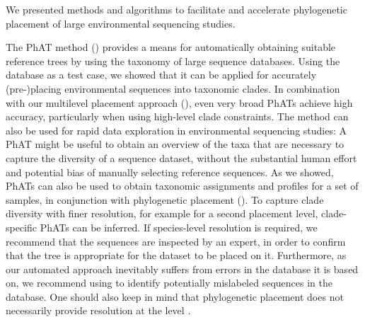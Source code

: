 We presented methods and algorithms to facilitate and accelerate
phylogenetic placement of large environmental sequencing studies. %

The \acf{PhAT} method () provides a means
for automatically obtaining suitable reference trees by using the taxonomy of large sequence databases.
Using the  database as a test case,
we showed that it can be applied for accurately (pre-)placing environmental sequences into taxonomic clades.
In combination with our multilevel placement approach (),
even very broad \acp{PhAT} achieve high accuracy, particularly when using high-level clade constraints.
The method can also be used for rapid data exploration in environmental sequencing studies:
A \ac{PhAT} might be useful to obtain an overview of the taxa that are necessary to capture the diversity of a sequence dataset,
without the substantial human effort and potential bias of manually selecting reference sequences.
As we showed, \acp{PhAT} can also be used to obtain taxonomic assignments and profiles for a set of samples,
in conjunction with phylogenetic placement ().
To capture clade diversity with finer resolution, for example for a second placement level,
clade-specific \acp{PhAT} can be inferred.
If species-level resolution is required, we recommend that the sequences are inspected by an expert,
in order to confirm that the tree is appropriate for the dataset to be placed on it.
Furthermore, as our automated approach inevitably suffers from errors in the database it is based on,
we recommend using  \citep{Kozlov2016}
to identify potentially mislabeled sequences in the database.
One should also keep in mind that phylogenetic placement
does not necessarily provide resolution at the  level \citep{Dunthorn2014}.

